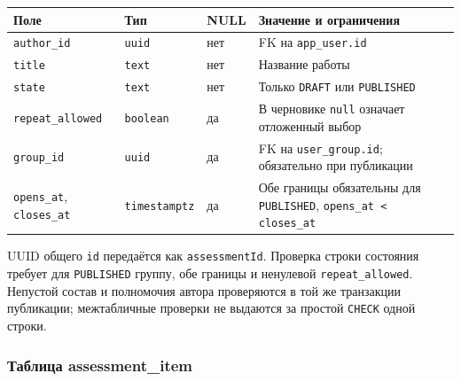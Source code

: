 \documentclass[12pt,a4paper]{article}
\newcounter{none} %
\begin{document}
{\def\LTcaptype{none} %
\begin{longtable}[]{@{}
  >{\raggedright\arraybackslash}p{}
  >{\raggedright\arraybackslash}p{}
  >{\raggedright\arraybackslash}p{}
  >{\raggedright\arraybackslash}p{}@{}}
\toprule\noalign{}
\begin{minipage}[b]{\linewidth}\raggedright
Поле
\end{minipage} & \begin{minipage}[b]{\linewidth}\raggedright
Тип
\end{minipage} & \begin{minipage}[b]{\linewidth}\raggedright
NULL
\end{minipage} & \begin{minipage}[b]{\linewidth}\raggedright
Значение и ограничения
\end{minipage} \\
\midrule\noalign{}
\endhead
\bottomrule\noalign{}
\endlastfoot
\texttt{author\_id} & \texttt{uuid} & нет & FK на \texttt{app\_\allowbreak{}user.\allowbreak{}id} \\
\texttt{title} & \texttt{text} & нет & Название работы \\
\texttt{state} & \texttt{text} & нет & Только \texttt{DRAFT} или \texttt{PUBLISHED} \\
\texttt{repeat\_\allowbreak{}allowed} & \texttt{boolean} & да & В черновике \texttt{null} означает отложенный выбор \\
\texttt{group\_id} & \texttt{uuid} & да & FK на \texttt{user\_\allowbreak{}group.\allowbreak{}id}; обязательно при публикации \\
\texttt{opens\_at}, \texttt{closes\_at} & \texttt{timestamptz} & да & Обе границы обязательны для \texttt{PUBLISHED}, \texttt{opens\_\allowbreak{}at < closes\_\allowbreak{}at} \\
\end{longtable}
}

UUID общего \texttt{id} передаётся как \texttt{assessment\allowbreak{}Id}. Проверка строки состояния требует для \texttt{PUBLISHED} группу, обе границы и ненулевой \texttt{repeat\_\allowbreak{}allowed}. Непустой состав и полномочия автора проверяются в той же транзакции публикации; межтабличные проверки не выдаются за простой \texttt{CHECK} одной строки.

\subsubsection{Таблица assessment\_item}\label{ux442ux430ux431ux43bux438ux446ux430-assessment_item}
\end{document}
